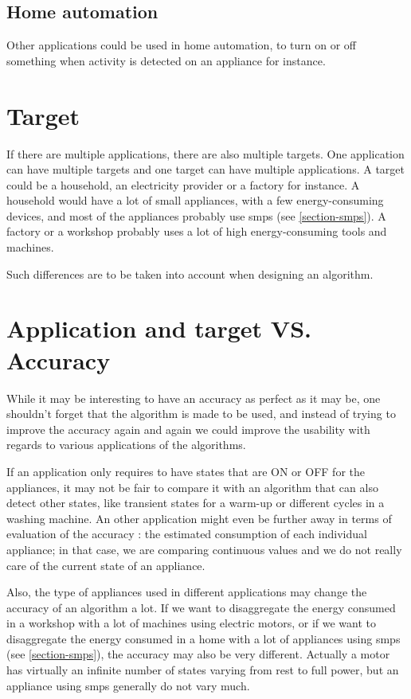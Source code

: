 \subsection{Home automation}
Other applications could be used in home automation, to turn on or off something when activity is detected on an appliance for instance.


\section{Target}\label{section-target}
If there are multiple applications, there are also multiple targets. One application can have multiple targets and one target can have multiple applications. A target could be a household, an electricity provider or a factory for instance. A household would have a lot of small appliances, with a few energy-consuming devices, and most of the appliances probably use \acrshort{smps} (see \autoref{section-smps}). A factory or a workshop probably uses a lot of high energy-consuming tools and machines.

Such differences are to be taken into account when designing an algorithm.


\section{Application and target VS. Accuracy}
While it may be interesting to have an accuracy as perfect as it may be, one shouldn't forget that the algorithm is made to be used, and instead of trying to improve the accuracy again and again we could improve the usability with regards to various applications of the algorithms. \cite{barker2014nilm} 

If an application only requires to have states that are ON or OFF for the appliances, it may not be fair to compare it with an algorithm that can also detect other states, like transient states for a warm-up or different cycles in a washing machine. An other application might even be further away in terms of evaluation of the accuracy : the estimated consumption of each individual appliance; in that case, we are comparing continuous values and we do not really care of the current state of an appliance.

Also, the type of appliances used in different applications may change the accuracy of an algorithm a lot. If we want to disaggregate the energy consumed in a workshop with a lot of machines using electric motors, or if we want to disaggregate the energy consumed in a home with a lot of appliances using \acrshort{smps} (see \autoref{section-smps}), the accuracy may also be very different. Actually a motor has virtually an infinite number of states varying from rest to full power, but an appliance using \acrshort{smps} generally do not vary much.

